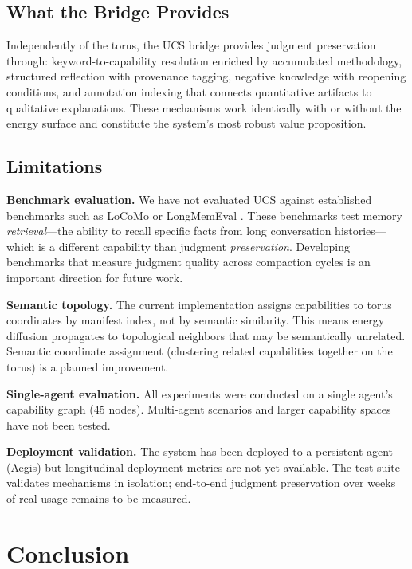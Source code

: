 \documentclass[11pt,a4paper]{article}
\begin{document}
\subsection{What the Bridge Provides}

Independently of the torus, the UCS bridge provides judgment
preservation through: keyword-to-capability resolution enriched by
accumulated methodology, structured reflection with provenance tagging,
negative knowledge with reopening conditions, and annotation indexing
that connects quantitative artifacts to qualitative explanations.
These mechanisms work identically with or without the energy surface
and constitute the system's most robust value proposition.

\subsection{Limitations}

\textbf{Benchmark evaluation.} We have not evaluated UCS against
established benchmarks such as LoCoMo \citep{locomo2024} or
LongMemEval \citep{longmemeval2025}. These benchmarks test memory
\emph{retrieval}---the ability to recall specific facts from long
conversation histories---which is a different capability than judgment
\emph{preservation}. Developing benchmarks that measure judgment
quality across compaction cycles is an important direction for future
work.

\textbf{Semantic topology.} The current implementation assigns
capabilities to torus coordinates by manifest index, not by semantic
similarity. This means energy diffusion propagates to topological
neighbors that may be semantically unrelated. Semantic coordinate
assignment (clustering related capabilities together on the torus)
is a planned improvement.

\textbf{Single-agent evaluation.} All experiments were conducted on a
single agent's capability graph (45 nodes). Multi-agent scenarios and
larger capability spaces have not been tested.

\textbf{Deployment validation.} The system has been deployed to a
persistent agent (Aegis) but longitudinal deployment metrics are not
yet available. The test suite validates mechanisms in isolation;
end-to-end judgment preservation over weeks of real usage remains to
be measured.


\section{Conclusion}
\label{sec:conclusion}
\end{document}

